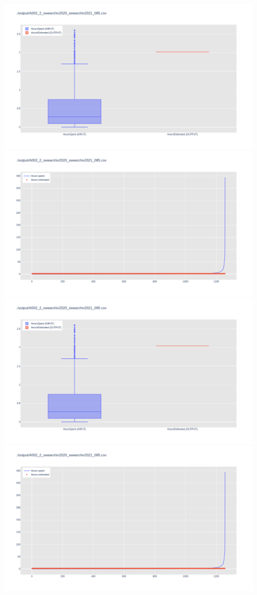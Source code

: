 \includegraphics[width=\textwidth]{Scripts/output/A002_2_swearchiv2020_swearchiv2021_085.csv.png}
\includegraphics[width=\textwidth]{Scripts/output/A002_2_swearchiv2020_swearchiv2021_085.csv.scatter.png}
\includegraphics[width=\textwidth]{Scripts/output/A002_2_swearchiv2020_swearchiv2021_095.csv.png}
\includegraphics[width=\textwidth]{Scripts/output/A002_2_swearchiv2020_swearchiv2021_095.csv.scatter.png}
